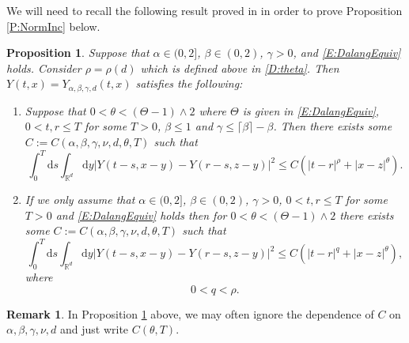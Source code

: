 \documentclass[a4paper,11pt]{article}
\numberwithin{equation}{section}
\theoremstyle{plain}
\newtheorem{proposition}[theorem]{Proposition}
\theoremstyle{definition}
\newtheorem{remark}[theorem]{Remark}
\newcommand{\ud}{\ensuremath{\mathrm{d} }}
\newcommand{\R}{\mathbb{R}}
\numberwithin{NQ}{section}
\numberwithin{LQ}{section}
\numberwithin{ZQ}{section}
\begin{document}
	We will need to recall the following result proved in \cite{CHN19} in order to prove Proposition \ref{P:NormInc} below. 
	
	\begin{proposition}{\normalfont\cite[Proposition 2.1 and 2.2]{ChenHu21}}
		\label{P:YInc}
		Suppose that $\alpha \in (0,2]$, $\beta \in (0,2)$, $\gamma>0$, and \eqref{E:DalangEquiv} holds. Consider $\rho = \rho(d)$ which is defined above in \eqref{D:theta}. Then $Y(t,x) = Y_{\alpha, \beta, \gamma, d}(t,x)$ satisfies the following:
		\begin{enumerate}
			\item \label{P:YIncCase1}  Suppose that $0< \theta < (\Theta -1) \wedge 2$ where $\Theta$ is given in \eqref{E:DalangEquiv}, $0< t,r \le T$ for some $T>0$, $\beta \le 1$ and $\gamma \le \lceil \beta \rceil - \beta$. Then there exists some $C := C(\alpha, \beta, \gamma, \nu, d, \theta, T)$ such that
			\[
			\int_0^T \ud s \int_{\R^d} \ud y |Y(t-s,x-y) - Y(r-s,z-y)|^2 \le C \left(|t-r|^\rho + |x-z|^{\theta}\right).
			\]
			\item \label{P:YIncCase2} If we only assume that $\alpha \in (0,2]$, $\beta \in (0,2)$, $\gamma>0$, $0< t,r \le T$ for some $T>0$ and \eqref{E:DalangEquiv} holds then for $0< \theta < (\Theta -1) \wedge 2$ there exists some $C := C(\alpha, \beta, \gamma, \nu, d, \theta, T)$ such that
			\[
			\int_0^T \ud s \int_{\R^d} \ud y |Y(t-s,x-y) - Y(r-s,z-y)|^2 \le C \left(|t-r|^q + |x-z|^{\theta}\right),
			\]
			where 
			\[
			0 < q < \rho.
			\]
		\end{enumerate}
	\end{proposition}
	
	\begin{remark}
		In Proposition \ref{P:YInc} above, we may often ignore the dependence of $C$ on $\alpha, \beta, \gamma, \nu, d$ and just write $C(\theta, T)$. 
	\end{remark}
	
\end{document}
